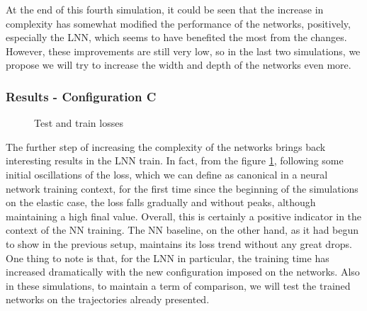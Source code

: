 \documentclass[a4paper]{article}
\begin{document}
At the end of this fourth simulation, it could be seen that the increase in complexity has somewhat modified the performance of the networks, positively, especially the LNN, which seems to have benefited the most from the changes. However, these improvements are still very low, so in the last two simulations, we propose we will try to increase the width and depth of the networks even more.\\

\subsubsection{Results - Configuration C}
\begin{figure}
    \centering
    \qquad
    \caption{Test and train losses}
    \label{fig:elastic_losses_700_5}
\end{figure}

The further step of increasing the complexity of the networks brings back interesting results in the LNN train. In fact, from the figure \ref{fig:elastic_losses_700_5}, following some initial oscillations of the loss, which we can define as canonical in a neural network training context, for the first time since the beginning of the simulations on the elastic case, the loss falls gradually and without peaks, although maintaining a high final value. Overall, this is certainly a positive indicator in the context of the NN training. The NN baseline, on the other hand, as it had begun to show in the previous setup, maintains its loss trend without any great drops. One thing to note is that, for the LNN in particular, the training time has increased dramatically with the new configuration imposed on the networks. Also in these simulations, to maintain a term of comparison, we will test the trained networks on the trajectories already presented.\\
\end{document}
